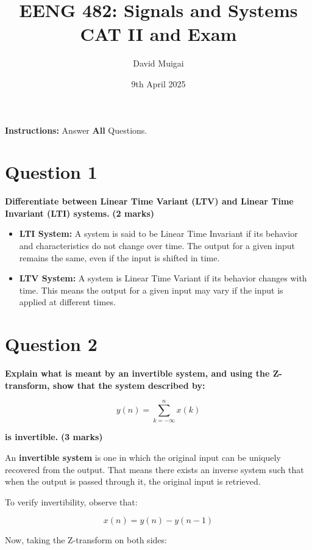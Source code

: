 \documentclass[12pt]{article}
\title{\textbf{EENG 482: Signals and Systems}\\ CAT II and Exam}
\date{9th April 2025}
\author{David Muigai}
\begin{document}
\maketitle	
\noindent \textbf{Instructions:} Answer \textbf{All} Questions.
    
    
    \section*{Question 1}
    
    \noindent \textbf{Differentiate between Linear Time Variant (LTV) and Linear Time Invariant (LTI) systems.} \textbf{(2 marks)}
    
    \begin{itemize}
    	\item \textbf{LTI System:} A system is said to be Linear Time Invariant if its behavior and characteristics do not change over time. The output for a given input remains the same, even if the input is shifted in time.
    	
    	\item \textbf{LTV System:} A system is Linear Time Variant if its behavior changes with time. This means the output for a given input may vary if the input is applied at different times.
    \end{itemize}
    
    \section*{Question 2}
    
    \noindent \textbf{Explain what is meant by an invertible system, and using the Z-transform, show that the system described by:}
    
    \[
    y(n) = \sum_{k=-\infty}^{n} x(k)
    \]
    
    \noindent \textbf{is invertible.} \textbf{(3 marks)}
    
    \bigskip
    
    \noindent An \textbf{invertible system} is one in which the original input can be uniquely recovered from the output. That means there exists an inverse system such that when the output is passed through it, the original input is retrieved.
    
    \bigskip
    
    \noindent To verify invertibility, observe that:
    
    \[
    x(n) = y(n) - y(n - 1)
    \]
    
    \noindent Now, taking the Z-transform on both sides:
    
\end{document}
